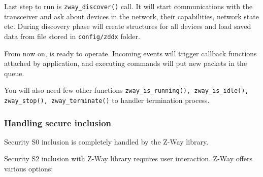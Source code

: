Last step to run \zway is \texttt{zway\_discover()} call. It will start communications 
with the \zwave transceiver and ask about devices in the network, their capabilities, 
network state etc. During discovery phase \zway will create structures for all devices and 
load saved data from file stored in \texttt{config/zddx} folder.

From now on, \zway is ready to operate. Incoming events will trigger callback functions 
attached by application, and executing commands will put new packets in the queue.

You will also need few other functions \texttt{zway\_is\_running(), zway\_is\_idle(), 
zway\_stop(), zway\_terminate()} to handler termination process.

\subsubsection{Handling secure inclusion}

Security S0 inclusion is completely handled by the Z-Way library.

Security S2 inclusion with Z-Way library requires user interaction. Z-Way offers various options:

